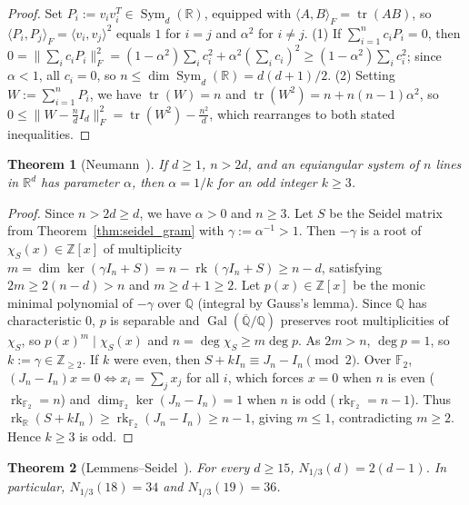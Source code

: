 \documentclass[11pt,reqno]{amsart}
\newtheorem{theorem}{Theorem}[section]
\theoremstyle{definition}
\theoremstyle{remark}
\numberwithin{equation}{section}
\numberwithin{table}{section}
\DeclareMathOperator{\tr}{tr}
\DeclareMathOperator{\rk}{rk}
\DeclareMathOperator{\Gal}{Gal}
\DeclareMathOperator{\Sym}{Sym}
\begin{document}
\begin{proof}
Set $P_i := v_i v_i^T \in \Sym_d(\mathbb{R})$, equipped with $\langle A, B \rangle_F = \tr(AB)$, so $\langle P_i, P_j \rangle_F = \langle v_i, v_j \rangle^2$ equals $1$ for $i = j$ and $\alpha^2$ for $i \neq j$.
(1) If $\sum_{i=1}^n c_i P_i = 0$, then $0 = \|\sum_i c_i P_i\|_F^2 = (1 - \alpha^2)\sum_i c_i^2 + \alpha^2(\sum_i c_i)^2 \ge (1 - \alpha^2)\sum_i c_i^2$; since $\alpha < 1$, all $c_i = 0$, so $n \le \dim\Sym_d(\mathbb{R}) = d(d+1)/2$.
(2) Setting $W := \sum_{i=1}^n P_i$, we have $\tr(W) = n$ and $\tr(W^2) = n + n(n-1)\alpha^2$, so $0 \le \|W - \frac{n}{d}I_d\|_F^2 = \tr(W^2) - \frac{n^2}{d}$, which rearranges to both stated inequalities.
\end{proof}

\begin{theorem}[Neumann~\cite{LemmensSeidel1973}]\label{thm:neumann}
If $d \ge 1$, $n > 2d$, and an equiangular system of $n$ lines in $\mathbb{R}^d$ has parameter $\alpha$, then $\alpha = 1/k$ for an odd integer $k \ge 3$.
\end{theorem}

\begin{proof}
Since $n > 2d \ge d$, we have $\alpha > 0$ and $n \ge 3$. Let $S$ be the Seidel matrix from Theorem~\ref{thm:seidel_gram} with $\gamma := \alpha^{-1} > 1$. Then $-\gamma$ is a root of $\chi_S(x) \in \mathbb{Z}[x]$ of multiplicity $m = \dim\ker(\gamma I_n + S) = n - \rk(\gamma I_n + S) \ge n - d$, satisfying $2m \ge 2(n - d) > n$ and $m \ge d + 1 \ge 2$. Let $p(x) \in \mathbb{Z}[x]$ be the monic minimal polynomial of $-\gamma$ over $\mathbb{Q}$ (integral by Gauss's lemma). Since $\mathbb{Q}$ has characteristic $0$, $p$ is separable and $\Gal(\overline{\mathbb{Q}}/\mathbb{Q})$ preserves root multiplicities of $\chi_S$, so $p(x)^m \mid \chi_S(x)$ and $n = \deg\chi_S \ge m \deg p$. As $2m > n$, $\deg p = 1$, so $k := \gamma \in \mathbb{Z}_{\ge 2}$. If $k$ were even, then $S + kI_n \equiv J_n - I_n \pmod 2$. Over $\mathbb{F}_2$, $(J_n - I_n)x = 0 \iff x_i = \sum_j x_j$ for all $i$, which forces $x = 0$ when $n$ is even ($\rk_{\mathbb{F}_2} = n$) and $\dim_{\mathbb{F}_2}\ker(J_n - I_n) = 1$ when $n$ is odd ($\rk_{\mathbb{F}_2} = n - 1$). Thus $\rk_{\mathbb{R}}(S + kI_n) \ge \rk_{\mathbb{F}_2}(J_n - I_n) \ge n - 1$, giving $m \le 1$, contradicting $m \ge 2$. Hence $k \ge 3$ is odd.
\end{proof}

\begin{theorem}[Lemmens--Seidel~\cite{LemmensSeidel1973}]\label{thm:lemmens_seidel}
For every $d \ge 15$, $N_{1/3}(d) = 2(d - 1)$. In particular, $N_{1/3}(18) = 34$ and $N_{1/3}(19) = 36$.
\end{theorem}
\end{document}
